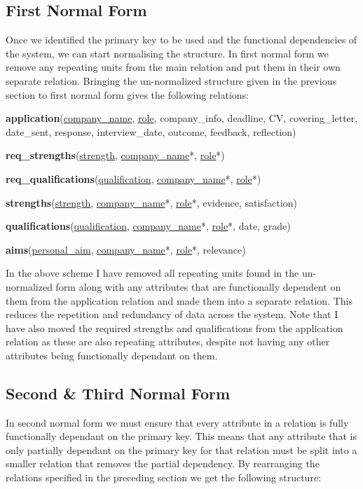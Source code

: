 \documentclass{article}
\begin{document}
\subsection{First Normal Form}

Once we identified the primary key to be used and the functional dependencies of the system, we can start normalising the structure. In first normal form we remove any repeating units from the main relation and put them in their own separate relation. Bringing the un-normalized structure given in the previous section to first normal form gives the following relations:

\textbf{application}(\underline{company\_name}, \underline{role}, company\_info, deadline, CV, covering\_letter, date\_sent, response, interview\_date, outcome, feedback, reflection)

\textbf{req\_strengths}(\underline{strength}, \underline{company\_name}*, \underline{role}*)

\textbf{req\_qualifications}(\underline{qualification}, \underline{company\_name}*, \underline{role}*)

\textbf{strengths}(\underline{strength}, \underline{company\_name}*, \underline{role}*, evidence, satisfaction)

\textbf{qualifications}(\underline{qualification}, \underline{company\_name}*, \underline{role}*, date, grade)

\textbf{aims}(\underline{personal\_aim}, \underline{company\_name}*, \underline{role}*, relevance)

In the above scheme I have removed all repeating units found in the un-normalized form along with any attributes that are functionally dependent on them from the application relation and made them into a separate relation. This reduces the repetition and redundancy of data across the system. Note that I have also moved the required strengths and qualifications from the application relation as these are also repeating attributes, despite not having any other attributes being functionally dependant on them.

\subsection{Second \& Third Normal Form}

In second normal form we must ensure that every attribute in a relation is fully functionally dependant on the primary key. This means that any attribute that is only partially dependant on the primary key for that relation must be split into a smaller relation that removes the partial dependency. By rearranging the relations specified in the preceding section we get the following structure:
\end{document}
